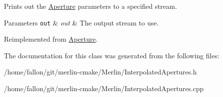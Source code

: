 Prints out the \hyperlink{classAperture}{Aperture} parameters to a specified stream. 
\begin{DoxyParams}[1]{Parameters}
\mbox{\tt out}  & {\em out} & The output stream to use. \\
\hline
\end{DoxyParams}


Reimplemented from \hyperlink{classAperture_aff2f276b93bb2cb94e559e1c4901e38e}{Aperture}.



The documentation for this class was generated from the following files\+:\begin{DoxyCompactItemize}
\item 
/home/fallon/git/merlin-\/cmake/\+Merlin/Interpolated\+Apertures.\+h\item 
/home/fallon/git/merlin-\/cmake/\+Merlin/Interpolated\+Apertures.\+cpp\end{DoxyCompactItemize}
